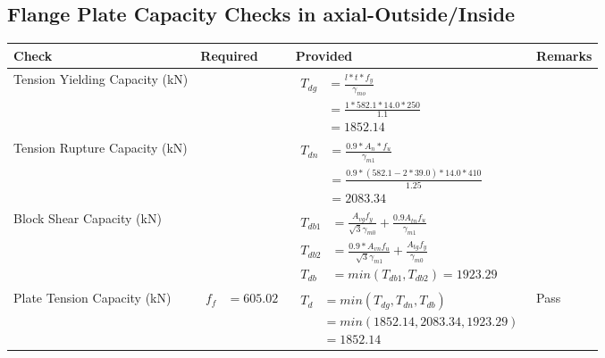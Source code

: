 \documentclass{article}%
\begin{document}
\subsection{Flange Plate Capacity Checks in axial{-}Outside/Inside }%
\label{subsec:FlangePlateCapacityChecksinaxial{-}Outside/Inside}%
\renewcommand{\arraystretch}{1.2}%
\begin{longtable}{|p{4cm}|p{6cm}|p{5.5cm}|p{1.5cm}|}%
\hline%
\rowcolor{OsdagGreen}%
Check&Required&Provided&Remarks\\%
\hline%
\endhead%
\hline%
Tension Yielding Capacity (kN)&&$\begin{aligned} T_{dg} &= \frac{l*t*f_y}{\gamma_{mo}}\\ &=\frac{1*582.1*14.0*250}{1.1}\\ &=1852.14\end{aligned}$&\\%
\hline%
Tension Rupture Capacity (kN)&&$\begin{aligned} T_{dn} &= \frac{0.9*A_{n}*f_u}{\gamma_{m1}}\\ &=\frac{0.9*(582.1-2*39.0)*14.0*410}{1.25}\\ &=2083.34\end{aligned}$&\\%
\hline%
Block Shear Capacity (kN)&&$\begin{aligned}T_{db1} &= \frac{A_{vg} f_{y}}{\sqrt{3} \gamma_{m0}} + \frac{0.9 A_{tn} f_{u}}{\gamma_{m1}}\\ T_{db2} &= \frac{0.9*A_{vn} f_{u}}{\sqrt{3} \gamma_{m1}} + \frac{A_{tg} f_{y}}{\gamma_{m0}}\\ T_{db} &= min(T_{db1}, T_{db2})= 1923.29\end{aligned}$&\\%
\hline%
Plate Tension Capacity (kN)&$\begin{aligned} f_f &=605.02\end{aligned}$&$\begin{aligned} T_d &= min(T_{dg},T_{dn},T_{db})\\ &= min(1852.14,2083.34,1923.29)\\ &=1852.14\end{aligned}$&Pass\\%
\hline%
\end{longtable}

%
\newpage%
\end{document}
